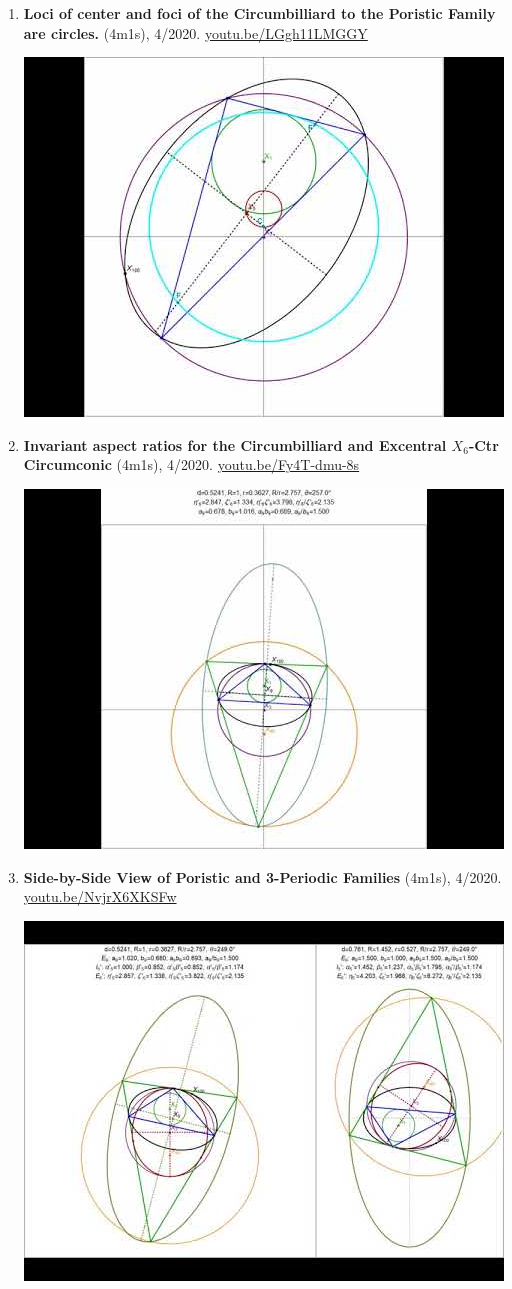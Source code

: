 \documentclass[12pt]{article}
\begin{document}
\begin{enumerate}[resume]
% 
\item \textbf{Loci of center and foci of the Circumbilliard to the Poristic Family are circles.} (4m1s), 4/2020. \href{https://youtu.be/LGgh11LMGGY}{\url{youtu.be/LGgh11LMGGY}}
\begin{center}\includegraphics[width=.5\textwidth]{pics/LGgh11LMGGY.jpg}\end{center}
% 
\item \textbf{Invariant aspect ratios for the Circumbilliard and Excentral $X_{6}$-Ctr Circumconic} (4m1s), 4/2020. \href{https://youtu.be/Fy4T-dmu-8s}{\url{youtu.be/Fy4T-dmu-8s}}
\begin{center}\includegraphics[width=.5\textwidth]{pics/Fy4T-dmu-8s.jpg}\end{center}
% 
\item \textbf{Side-by-Side View of Poristic and 3-Periodic Families} (4m1s), 4/2020. \href{https://youtu.be/NvjrX6XKSFw}{\url{youtu.be/NvjrX6XKSFw}}
\begin{center}\includegraphics[width=.5\textwidth]{pics/NvjrX6XKSFw.jpg}\end{center}

\end{enumerate}
\end{document}
